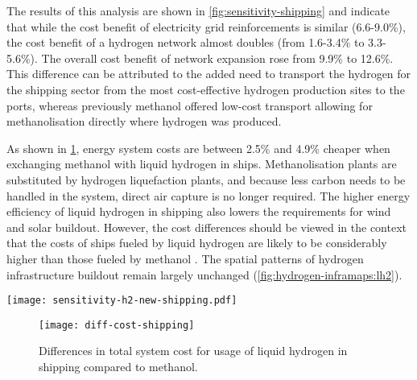 The results of this analysis are shown in \cref{fig:sensitivity-shipping} and
indicate that while the cost benefit of electricity grid reinforcements is
similar (6.6-9.0\%), the cost benefit of a hydrogen network almost doubles (from
1.6-3.4\% to 3.3-5.6\%). The overall cost benefit of network expansion rose from
9.9\% to 12.6\%. This difference can be attributed to the added need to
transport the hydrogen for the shipping sector from the most cost-effective
hydrogen production sites to the ports, whereas previously methanol offered
low-cost transport allowing for methanolisation directly where hydrogen was
produced.

As shown in \cref{fig:sensitivity-shipping-diff}, energy system costs are
between 2.5\% and 4.9\% cheaper when exchanging methanol with liquid hydrogen in
ships. Methanolisation plants are substituted by hydrogen liquefaction plants,
and because less carbon needs to be handled in the system, direct air capture is
no longer required. The higher energy efficiency of liquid hydrogen in shipping
also lowers the requirements for wind and solar buildout. However, the cost
differences should be viewed in the context that the costs of ships fueled by
liquid hydrogen are likely to be considerably higher than those fueled by
methanol . The spatial patterns of hydrogen
infrastructure buildout remain largely unchanged
(\cref{fig:hydrogen-inframaps:lh2}).

\begin{SCfigure}
    \centering
    \texttt{[image: sensitivity-h2-new-shipping.pdf]}
    \caption{Cost benefits of electricity and hydrogen network infrastructure with use of liquid hydrogen in shipping instead of methanol.}
    \label{fig:sensitivity-shipping}
\end{SCfigure}

\begin{figure}
    \centering
    \texttt{[image: diff-cost-shipping]}
    \caption{Differences in total system cost for usage of liquid hydrogen in shipping compared to methanol.}
    \label{fig:sensitivity-shipping-diff}
\end{figure}

